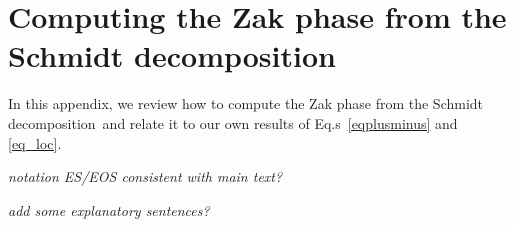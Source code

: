 \documentclass[twocolumn,amsmath,longbibliography,amssymb,superscriptaddress]{revtex4-1}
\newcommand{\maria}[1]{{\color{blue} #1}}
\newcommand{\mariac}[1]{{\it\color{cyan}#1}}
\begin{document}
	

	
\appendix


\section{Computing the Zak phase from the Schmidt decomposition}\label{app:pollmann}
\maria{In this appendix, we review  how to compute the Zak phase from the Schmidt decomposition~\cite{Zaletel2014}and relate it to our own results of Eq.s~\eqref{eqplusminus} and \eqref{eq_loc}.}

\mariac{notation ES/EOS consistent with main text?}

\mariac{add some explanatory sentences?}
\end{document}
